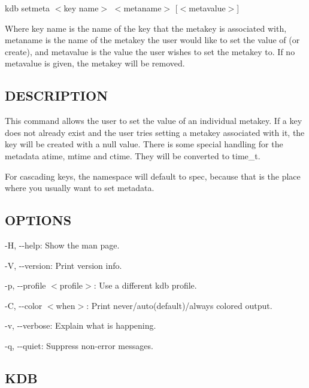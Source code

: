 {\ttfamily kdb setmeta $<$key name$>$ $<$metaname$>$ \mbox{[}$<$metavalue$>$\mbox{]}}

Where {\ttfamily key name} is the name of the key that the metakey is associated with, {\ttfamily metaname} is the name of the metakey the user would like to set the value of (or create), and {\ttfamily metavalue} is the value the user wishes to set the metakey to. If no {\ttfamily metavalue} is given, the metakey will be removed.

\subsection*{D\+E\+S\+C\+R\+I\+P\+T\+I\+ON}

This command allows the user to set the value of an individual metakey. If a key does not already exist and the user tries setting a metakey associated with it, the key will be created with a null value. There is some special handling for the metadata atime, mtime and ctime. They will be converted to time\+\_\+t.

For cascading keys, the namespace will default to {\ttfamily spec}, because that is the place where you usually want to set metadata.

\subsection*{O\+P\+T\+I\+O\+NS}


\begin{DoxyItemize}
\item {\ttfamily -\/H}, {\ttfamily -\/-\/help}\+: Show the man page.
\item {\ttfamily -\/V}, {\ttfamily -\/-\/version}\+: Print version info.
\item {\ttfamily -\/p}, {\ttfamily -\/-\/profile $<$profile$>$}\+: Use a different kdb profile.
\item {\ttfamily -\/C}, {\ttfamily -\/-\/color $<$when$>$}\+: Print never/auto(default)/always colored output.
\item {\ttfamily -\/v}, {\ttfamily -\/-\/verbose}\+: Explain what is happening.
\item {\ttfamily -\/q}, {\ttfamily -\/-\/quiet}\+: Suppress non-\/error messages.
\end{DoxyItemize}

\subsection*{K\+DB}


